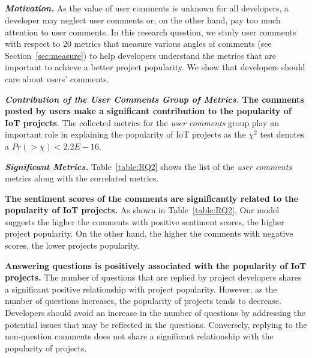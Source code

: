 \begin{comment}
\end{comment}
\subsection*{\bfseries\RQtwo}



\noindent\textbf{\textit{Motivation.}} As the value of user comments is unknown
for all developers, a developer may neglect user comments or, on the other
hand, pay too much attention to user comments. In this research question, we
study user comments with respect to $20$ metrics that measure various angles of
comments (see Section~\ref{sec:measure}) to help developers understand the
metrics that are important to achieve a better project popularity. We show that
developers should care about users' comments.

\noindent\textbf{\textit{Contribution of the User Comments Group of Metrics.}}
\textbf{The comments posted by users make a significant contribution to the
popularity of IoT projects}. The collected metrics for the {\em user comments}
group play an important role in explaining the popularity of IoT projects as
the $\chi^2$ test denotes a $Pr(>\chi)<2.2E-16$.

\noindent\textbf{\textit{Significant Metrics.}} Table~\ref{table:RQ2} shows the
list of the {\em user comments} metrics along with the correlated metrics.

\textbf{The sentiment scores of the comments are significantly related to the
popularity of IoT projects.} As shown in Table~\ref{table:RQ2}, Our model
suggests the higher the comments with positive sentiment scores, the higher
project popularity. On the other hand, the higher the comments with negative
scores, the lower projects popularity.

\textbf{Answering questions is positively associated with the popularity of IoT
projects.} The number of questions that are replied by project developers
shares a significant positive relationship with project popularity. However, as
the number of questions increases, the popularity of projects tends to
decrease.  Developers should avoid an increase in the number of questions by
addressing the potential issues that may be reflected in the questions.
Conversely, replying to the non-question comments does not share a significant
relationship with the popularity of projects.


